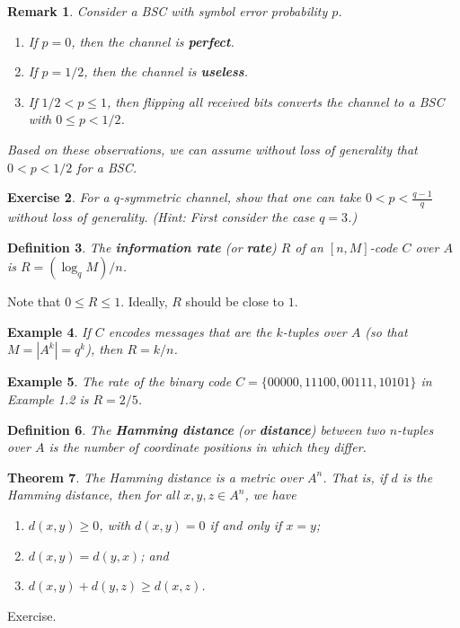 \documentclass[10pt]{article}
\makeatletter
\theoremstyle{newstyle}
\newtheorem{thm}{Theorem}[subsection]
\newtheorem{remark}[thm]{Remark}
\newtheorem{defn}[thm]{Definition}
\newtheorem{exercise}[thm]{Exercise}
\newtheorem{exmp}[thm]{Example}
\newenvironment{pf}[1][\proofname]{\par
  \pushQED{\qed}%
  \normalfont \topsep0\p@\relax
  \trivlist
  \item[\hskip\labelsep\scshape
  #1\@addpunct{.}]\ignorespaces
}{%
  \popQED\endtrivlist\@endpefalse
}
\makeatother
\begin{document}
\begin{remark}
Consider a BSC with symbol error probability $p$.
\begin{enumerate}[(1)]
    \item If $p = 0$, then the channel is {\bf perfect}.
    \item If $p = 1/2$, then the channel is {\bf useless}.
    \item If $1/2 < p \leq 1$, then flipping all received bits converts the channel to a 
    BSC with $0 \leq p < 1/2$. 
\end{enumerate}
Based on these observations, we can assume without loss of generality that $0 < p < 1/2$ 
for a BSC.
\end{remark}

\begin{exercise}
For a $q$-symmetric channel, show that one can take $0 < p < \frac{q-1}q$ without loss of generality. 
(Hint: First consider the case $q = 3$.)
\end{exercise}

\begin{defn}
The {\bf information rate} (or {\bf rate}) $R$ of an $[n, M]$-code $C$ over $A$ is $R = 
(\log_q M)/n$.
\end{defn}

Note that $0 \leq R \leq 1$. Ideally, $R$ should be close to $1$. 

\begin{exmp}
If $C$ encodes messages that are the $k$-tuples over $A$ (so that $M = |A^k| = q^k$), 
then $R = k/n$.
\end{exmp}

\begin{exmp}
The rate of the binary code $C = \{00000, 11100, 00111, 10101\}$ in Example 1.2 is $R = 2/5$.
\end{exmp}

\begin{defn}
The {\bf Hamming distance} (or {\bf distance}) between two $n$-tuples over $A$ is the number of 
coordinate positions in which they differ.
\end{defn}

\begin{thm}
The Hamming distance is a metric over $A^n$. That is, if $d$ is the Hamming distance, 
then for all $x, y, z \in A^n$, we have 
\begin{enumerate}[(1)]
    \item $d(x, y) \geq 0$, with $d(x, y) = 0$ if and only if $x = y$;
    \item $d(x, y) = d(y, x)$; and
    \item $d(x, y) + d(y, z) \geq d(x, z)$.
\end{enumerate}
\end{thm}
\begin{pf}
Exercise.
\end{pf}
\end{document}
